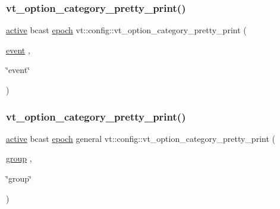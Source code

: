 \subsubsection{\texorpdfstring{vt\+\_\+option\+\_\+category\+\_\+pretty\+\_\+print()}{vt\_option\_category\_pretty\_print()}\hspace{0.1cm}{\footnotesize\ttfamily [4/17]}}
{\footnotesize\ttfamily \hyperlink{namespacevt_1_1config_a6bd1d6215bda0d8ca02811798399f689a82f77c67af0c363709010c6df4dbd920}{active} bcast \hyperlink{namespacevt_1_1config_a6bd1d6215bda0d8ca02811798399f689a05bdb92281360bcbfdf239ad3ccbde19}{epoch} vt\+::config\+::vt\+\_\+option\+\_\+category\+\_\+pretty\+\_\+print (\begin{DoxyParamCaption}\item[{\hyperlink{namespacevt_1_1config_a6bd1d6215bda0d8ca02811798399f689a9e0b3f734ed730f6f3117f0687eda7df}{event}}]{,  }\item[{\char`\"{}event\char`\"{}}]{ }\end{DoxyParamCaption})}

\mbox{\label{namespacevt_1_1config_a4136d8971d8d7c47b42010d1e0724bf8}} 
\subsubsection{\texorpdfstring{vt\+\_\+option\+\_\+category\+\_\+pretty\+\_\+print()}{vt\_option\_category\_pretty\_print()}\hspace{0.1cm}{\footnotesize\ttfamily [5/17]}}
{\footnotesize\ttfamily \hyperlink{namespacevt_1_1config_a6bd1d6215bda0d8ca02811798399f689a82f77c67af0c363709010c6df4dbd920}{active} bcast \hyperlink{namespacevt_1_1config_a6bd1d6215bda0d8ca02811798399f689a05bdb92281360bcbfdf239ad3ccbde19}{epoch} general vt\+::config\+::vt\+\_\+option\+\_\+category\+\_\+pretty\+\_\+print (\begin{DoxyParamCaption}\item[{\hyperlink{namespacevt_1_1config_a6bd1d6215bda0d8ca02811798399f689a132506d2b8e888d0a91ae4470d4197c1}{group}}]{,  }\item[{\char`\"{}group\char`\"{}}]{ }\end{DoxyParamCaption})}

